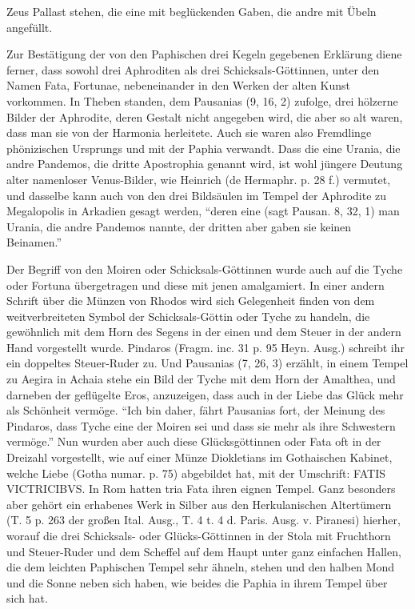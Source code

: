 \documentclass[a4paper, 11pt, oneside, polutonikogreek, german]{article}
\begin{document}
Zeus Pallast stehen, die eine mit beglückenden Gaben, die andre mit Übeln angefüllt.

Zur Bestätigung der von den Paphischen drei Kegeln gegebenen Erklärung diene ferner, dass sowohl drei Aphroditen als drei Schicksals-Göttinnen, unter den Namen Fata, Fortunae, nebeneinander in den Werken der alten Kunst vorkommen. In Theben standen, dem Pausanias (9, 16, 2) zufolge, drei hölzerne Bilder der Aphrodite, deren Gestalt nicht angegeben wird, die aber so alt waren, dass man sie von der Harmonia herleitete. Auch sie waren also Fremdlinge phönizischen Ursprungs und mit der Paphia verwandt. Dass die eine Urania, die andre Pandemos, die dritte Apostrophia genannt wird, ist wohl jüngere Deutung alter namenloser Venus-Bilder, wie Heinrich (de Hermaphr. p. 28 f.) vermutet, und dasselbe kann auch von den drei Bildsäulen im Tempel der Aphrodite zu Megalopolis in Arkadien gesagt werden, "`deren eine (sagt Pausan. 8, 32, 1) man Urania, die andre Pandemos nannte, der dritten aber gaben sie keinen Beinamen."'

Der Begriff von den Moiren oder Schicksals-Göttinnen wurde auch auf die Tyche oder Fortuna übergetragen und diese mit jenen amalgamiert. In einer andern Schrift über die Münzen von Rhodos wird sich Gelegenheit finden von dem weitverbreiteten Symbol der Schicksals-Göttin oder Tyche zu handeln, die gewöhnlich mit dem Horn des Segens in der einen und dem Steuer in der andern Hand vorgestellt wurde. Pindaros (Fragm. inc. 31 p. 95 Heyn. Ausg.) schreibt ihr ein doppeltes Steuer-Ruder zu. Und Pausanias (7, 26, 3) erzählt, in einem Tempel zu Aegira in Achaia stehe ein Bild der Tyche mit dem Horn der Amalthea, und darneben der geflügelte Eros, anzuzeigen, dass auch in der Liebe das Glück mehr als Schönheit vermöge. "`Ich bin daher, fährt Pausanias fort, der Meinung des Pindaros, dass Tyche eine der Moiren sei und dass sie mehr als ihre Schwestern vermöge."' Nun wurden aber auch diese Glücksgöttinnen oder Fata oft in der Dreizahl vorgestellt, wie auf einer Münze Diokletians im Gothaischen Kabinet, welche Liebe (Gotha numar. p. 75) abgebildet hat, mit der Umschrift: FATIS VICTRICIBVS. In Rom hatten tria Fata ihren eignen Tempel. Ganz besonders aber gehört ein erhabenes Werk in Silber aus den Herkulanischen Altertümern (T. 5 p. 263 der großen Ital. Ausg., T. 4 t. 4 d. Paris. Ausg. v. Piranesi) hierher, worauf die drei Schicksals- oder Glücks-Göttinnen in der Stola mit Fruchthorn und Steuer-Ruder und dem Scheffel auf dem Haupt unter ganz einfachen Hallen, die dem leichten Paphischen Tempel sehr ähneln, stehen und den halben Mond und die Sonne neben sich haben, wie beides die Paphia in ihrem Tempel über sich hat.
\end{document}
